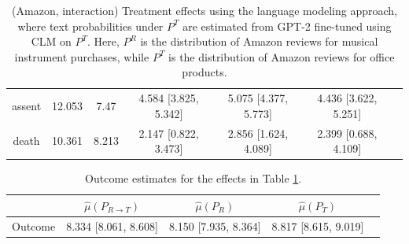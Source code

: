 \documentclass{article}
\begin{document}
\begin{table}[!ht]
\begin{tabular}{c|cccccc}
    assent      &             12.053 &              7.47  & 4.584 [3.825, 5.342]             & 5.075 [4.377, 5.773]  & 4.436 [3.622, 5.251]   \\
    death       &             10.361 &              8.213 & 2.147 [0.822, 3.473]             & 2.856 [1.624, 4.089]  & 2.399 [0.688, 4.109]   \\
\bottomrule
\end{tabular}
\caption{(Amazon, interaction) Treatment effects using the language modeling approach, where text probabilities under $P^T$ are estimated from GPT-2 fine-tuned using CLM on $P^T$. Here, $P^R$ is the distribution of Amazon reviews for musical instrument purchases, while $P^T$ is the distribution of Amazon reviews for office products.}
\label{tab:results_clm_gpt2_amazon_synthetic_interaction_finetuned_pt}
\end{table}

\begin{table}[!ht]
\centering
\begin{tabular}{c|cccc}
\toprule
    & $\hat{\mu}(P_{R \rightarrow T})$   & $\hat{\mu}(P_R)$     & $\hat{\mu}(P_T)$     \\
\midrule
    Outcome & 8.334 [8.061, 8.608]               & 8.150 [7.935, 8.364] & 8.817 [8.615, 9.019] \\
\bottomrule
\end{tabular}
\caption{Outcome estimates for the effects in Table \ref{tab:results_clm_gpt2_amazon_synthetic_interaction_finetuned_pt}.}
\label{tab:results_clm_gpt2_amazon_synthetic_interaction_finetuned_pt_outcome}
\end{table}
\end{document}
